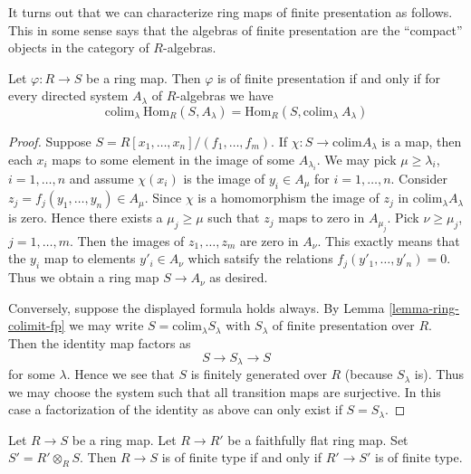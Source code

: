 \noindent
It turns out that we can characterize ring maps of finite
presentation as follows. This in some sense says that the
algebras of finite presentation are the ``compact'' objects
in the category of $R$-algebras.

\begin{lemma}
\label{lemma-characterize-finite-presentation}
Let $\varphi : R \to S$ be a ring map.
Then $\varphi$ is of finite presentation if and only if
for every directed system $A_\lambda$ of $R$-algebras
we have
$$
\text{colim}_\lambda\ \text{Hom}_R(S, A_\lambda)
=
\text{Hom}_R(S, \text{colim}_\lambda\ A_\lambda)
$$
\end{lemma}

\begin{proof}
Suppose $S = R[x_1, \ldots, x_n] / (f_1, \ldots, f_m)$.
If $\chi : S \to \text{colim} A_\lambda$ is a map, then each
$x_i$ maps to some element in the image of some $A_{\lambda_i}$.
We may pick $\mu \geq \lambda_i$, $i = 1, \ldots, n$ and
assume $\chi(x_i)$ is the image of $y_i \in A_\mu$ for
$i = 1, \ldots, n$. Consider $z_j = f_j(y_1, \ldots, y_n) \in A_\mu$.
Since $\chi$ is a homomorphism the image of $z_j$ in
$\text{colim}_\lambda A_\lambda$ is zero. Hence there exists a
$\mu_j \geq \mu$ such that $z_j$ maps to zero in $A_{\mu_j}$.
Pick $\nu \geq \mu_j$, $j = 1, \ldots, m$. Then the
images of $z_1, \ldots, z_m$ are zero in $A_\nu$. This
exactly means that the $y_i$ map to elements
$y'_i \in A_\nu$ which satsify the relations $f_j(y'_1, \ldots, y'_n) = 0$.
Thus we obtain a ring map $S \to A_\nu$ as desired.

\medskip\noindent
Conversely, suppose the displayed formula holds always.
By Lemma \ref{lemma-ring-colimit-fp} we may write
$S = \text{colim}_\lambda S_\lambda$ with $S_\lambda$
of finite presentation over $R$. Then the identity map
factors as
$$
S \to S_\lambda \to S
$$
for some $\lambda$. Hence we see that $S$ is finitely generated
over $R$ (because $S_\lambda$ is). Thus we may choose the system
such that all transition maps are surjective. In this case
a factorization of the identity as above can only exist if
$S = S_\lambda$.
\end{proof}

\begin{lemma}
\label{lemma-finite-type-descends}
Let $R \to S$ be a ring map.
Let $R \to R'$ be a faithfully flat ring map.
Set $S' = R'\otimes_R S$.
Then $R \to S$ is of finite type if and only if $R' \to S'$
is of finite type.
\end{lemma}

